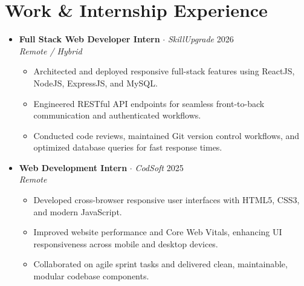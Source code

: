 \documentclass[a4paper,9.5pt]{article}
\begin{document}
\section{Work \& Internship Experience}
\begin{itemize}[leftmargin=0.1in, label={}, itemsep=1pt, topsep=1pt]
    \item
    \textbf{\footnotesize Full Stack Web Developer Intern} $\cdot$ \emph{\footnotesize SkillUpgrade} \hfill \footnotesize 2026 \\
    \textit{\footnotesize Remote / Hybrid}
    \begin{itemize}[leftmargin=0.15in, itemsep=-2pt, topsep=0pt]
        \footnotesize \item Architected and deployed responsive full-stack features using ReactJS, NodeJS, ExpressJS, and MySQL.
        \footnotesize \item Engineered RESTful API endpoints for seamless front-to-back communication and authenticated workflows.
        \footnotesize \item Conducted code reviews, maintained Git version control workflows, and optimized database queries for fast response times.
    \end{itemize}

    \item
    \textbf{\footnotesize Web Development Intern} $\cdot$ \emph{\footnotesize CodSoft} \hfill \footnotesize 2025 \\
    \textit{\footnotesize Remote}
    \begin{itemize}[leftmargin=0.15in, itemsep=-2pt, topsep=0pt]
        \footnotesize \item Developed cross-browser responsive user interfaces with HTML5, CSS3, and modern JavaScript.
        \footnotesize \item Improved website performance and Core Web Vitals, enhancing UI responsiveness across mobile and desktop devices.
        \footnotesize \item Collaborated on agile sprint tasks and delivered clean, maintainable, modular codebase components.
    \end{itemize}
\end{itemize}

\end{document}
